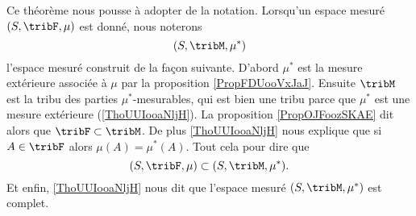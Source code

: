 \begin{normaltext}

Ce théorème nous pousse à adopter de la notation. Lorsqu'un espace mesuré \( (S,\tribF,\mu)\) est donné, nous noterons 
\begin{equation}
    (S,\tribM,\mu^*)   
\end{equation}
l'espace mesuré construit de la façon suivante. D'abord \( \mu^*\) est la mesure extérieure associée à \( \mu\) par la proposition \ref{PropFDUooVxJaJ}. Ensuite \( \tribM\) est la tribu des parties \( \mu^*\)-mesurables, qui est bien une tribu parce que \( \mu^*\) est une mesure extérieure (\ref{ThoUUIooaNljH}). La proposition \eqref{PropOJFoozSKAE} dit alors que \( \tribF\subset\tribM\). De plus \ref{ThoUUIooaNljH} nous explique que si \( A\in\tribF\) alors \( \mu(A)=\mu^*(A)\). Tout cela pour dire que
\begin{equation}    \label{EqXDPooKwWAF}
    (S,\tribF,\mu)\subset (S,\tribM,\mu^*).
\end{equation}
Et enfin, \ref{ThoUUIooaNljH} nous dit que l'espace mesuré \( (S,\tribM,\mu^*)\) est complet.
\end{normaltext}


